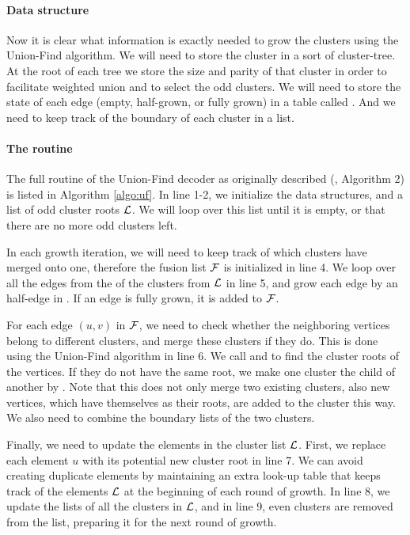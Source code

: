 \paragraph{Data structure}
Now it is clear what information is exactly needed to grow the clusters using the Union-Find algorithm. We will need to store the cluster in a sort of cluster-tree. At the root of each tree we store the size and parity of that cluster in order to facilitate weighted union and to select the odd clusters. We will need to store the state of each edge (empty, half-grown, or fully grown) in a table called . And we need to keep track of the boundary of each cluster in a  list.

\paragraph{The routine}
The full routine of the Union-Find decoder as originally described (\cite{delfosse2017almost}, Algorithm 2) is listed in Algorithm \ref{algo:uf}. In line 1-2, we initialize the data structures, and a list of odd cluster roots $\mathcal{L}$. We will loop over this list until it is empty, or that there are no more odd clusters left.

In each growth iteration, we will need to keep track of which clusters have merged onto one, therefore the fusion list $\mathcal{F}$ is initialized in line 4. We loop over all the edges from the  of the clusters from $\mathcal{L}$ in line 5, and grow each edge by an half-edge in . If an edge is fully grown, it is added to $\mathcal{F}$.

For each edge $(u,v)$ in $\mathcal{F}$, we need to check whether the neighboring vertices belong to different clusters, and merge these clusters if they do. This is done using the Union-Find algorithm in line 6. We call  and  to find the cluster roots of the vertices. If they do not have the same root, we make one cluster the child of another by . Note that this does not only merge two existing clusters, also new vertices, which have themselves as their roots, are added to the cluster this way. We also need to combine the boundary lists of the two clusters.

Finally, we need to update the elements in the cluster list $\mathcal{L}$. First, we replace each element $u$ with its potential new cluster root  in line 7. We can avoid creating duplicate elements by maintaining an extra look-up table that keeps track of the elements $\mathcal{L}$ at the beginning of each round of growth. In line 8, we update the  lists of all the clusters in $\mathcal{L}$, and in line 9, even clusters are removed from the list, preparing it for the next round of growth.

